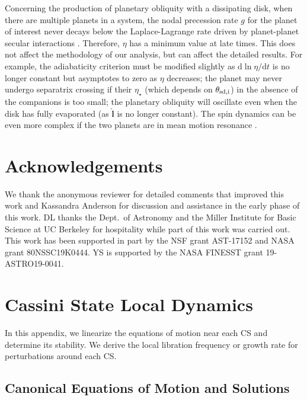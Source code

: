 \documentclass[twocolumn,twocolappendix]{aastex63}
\newcommand*{\rdil}[2]{\mathrm{d}#1 / \mathrm{d}#2}
\newcommand*{\bsmb}[1]{\boldsymbol{\mathbf{#1}}}
\newcommand*{\uv}[1]{\hat{\bsmb{#1}}}
\begin{document}
Concerning the production of planetary obliquity with a
dissipating disk, when there are multiple planets in a system, the nodal
precession rate $g$ for the planet of interest never decays below the
Laplace-Lagrange rate driven by planet-planet secular interactions
\citep{millholland_disk}. Therefore, $\eta$ has a minimum value at late times.
This does not affect the methodology of our analysis, but can affect the
detailed results. For example, the adiabaticity criterion must be modified
slightly as $\rdil{\ln \eta}{t}$ is no longer constant but asymptotes to zero as
$\eta$ decreases; the planet may never undergo separatrix crossing if their
$\eta_{\star}$ (which depends on $\theta_{\rm sd, i}$) in the absence of the
companions is too small; the planetary obliquity will oscillate even when the
disk has fully evaporated (as $\uv{l}$ is no longer constant). The spin dynamics
can be even more complex if the two planets are in mean motion resonance
\citep[e.g.][]{millholland2019obliquity}.

\section*{Acknowledgements}

We thank the anonymous reviewer for detailed comments that
improved this work and Kassandra Anderson for discussion and assistance in the
early phase of this work. DL thanks the Dept.\ of Astronomy and the Miller
Institute for Basic Science at UC Berkeley for hospitality while part of this
work was carried out. This work has been supported in part by the NSF grant
AST-17152 and NASA grant 80NSSC19K0444. YS is supported by the NASA FINESST
grant 19-ASTRO19-0041.%




\appendix

\section{Cassini State Local Dynamics}\label{s:local_dynamics}

In this appendix, we linearize the equations of motion near each CS and
determine its stability. We derive the local libration frequency or growth
rate for perturbations around each CS\@.

\subsection{Canonical Equations of Motion and Solutions}\label{ss:canonical}
\end{document}
